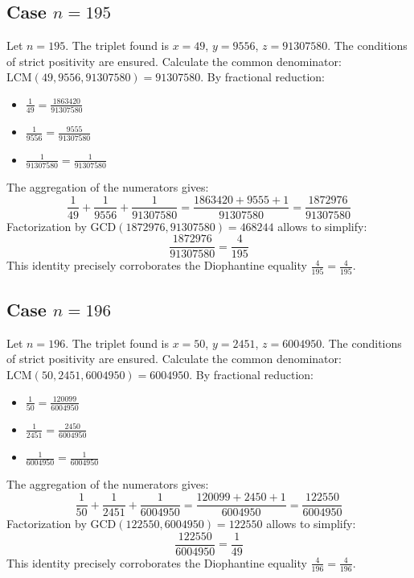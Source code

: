 \documentclass[11pt,a4paper]{article}
\begin{document}
\subsection{Case $n = 195$}
Let $n = 195$. The triplet found is $x = 49$, $y = 9556$, $z = 91307580$.
The conditions of strict positivity are ensured.
Calculate the common denominator: $\text{LCM}(49, 9556, 91307580) = 91307580$.
By fractional reduction:
\begin{itemize}
    \item $\frac{1}{49} = \frac{1863420}{91307580}$
    \item $\frac{1}{9556} = \frac{9555}{91307580}$
    \item $\frac{1}{91307580} = \frac{1}{91307580}$
\end{itemize}
The aggregation of the numerators gives:
$$ \frac{1}{49} + \frac{1}{9556} + \frac{1}{91307580} = \frac{1863420 + 9555 + 1}{91307580} = \frac{1872976}{91307580} $$
Factorization by $\text{GCD}(1872976, 91307580) = 468244$ allows to simplify:
$$ \frac{1872976}{91307580} = \frac{4}{195} $$
This identity precisely corroborates the Diophantine equality $\frac{4}{195} = \frac{4}{195}$.

\subsection{Case $n = 196$}
Let $n = 196$. The triplet found is $x = 50$, $y = 2451$, $z = 6004950$.
The conditions of strict positivity are ensured.
Calculate the common denominator: $\text{LCM}(50, 2451, 6004950) = 6004950$.
By fractional reduction:
\begin{itemize}
    \item $\frac{1}{50} = \frac{120099}{6004950}$
    \item $\frac{1}{2451} = \frac{2450}{6004950}$
    \item $\frac{1}{6004950} = \frac{1}{6004950}$
\end{itemize}
The aggregation of the numerators gives:
$$ \frac{1}{50} + \frac{1}{2451} + \frac{1}{6004950} = \frac{120099 + 2450 + 1}{6004950} = \frac{122550}{6004950} $$
Factorization by $\text{GCD}(122550, 6004950) = 122550$ allows to simplify:
$$ \frac{122550}{6004950} = \frac{1}{49} $$
This identity precisely corroborates the Diophantine equality $\frac{4}{196} = \frac{4}{196}$.
\end{document}
